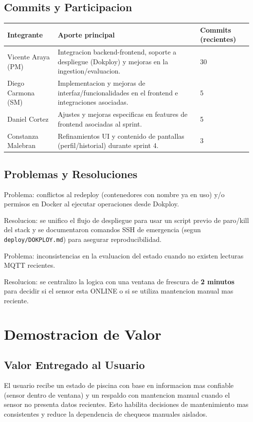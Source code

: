 \documentclass[11pt, a4paper]{article}
\begin{document}
\subsection{Commits y Participacion}
\begin{longtable}{@{} p{4cm} p{10.5cm} p{2cm} @{}}
  \toprule
  \textbf{Integrante} & \textbf{Aporte principal} & \textbf{Commits (recientes)} \\
  \midrule
  Vicente Araya (PM) & Integracion backend-frontend, soporte a despliegue (Dokploy) y mejoras en la ingestion/evaluacion. & 30 \\
  \midrule
  Diego Carmona (SM) & Implementacion y mejoras de interfaz/funcionalidades en el frontend e integraciones asociadas. & 5 \\
  \midrule
  Daniel Cortez & Ajustes y mejoras especificas en features de frontend asociadas al sprint. & 5 \\
  \midrule
  Constanza Malebran & Refinamientos UI y contenido de pantallas (perfil/historial) durante sprint 4. & 3 \\
  \bottomrule
\end{longtable}

\subsection{Problemas y Resoluciones}
Problema: conflictos al redeploy (contenedores con nombre ya en uso) y/o permisos en Docker al ejecutar operaciones desde Dokploy.

Resolucion: se unifico el flujo de despliegue para usar un script previo de paro/kill del stack y se documentaron comandos SSH de emergencia (segun \texttt{deploy/DOKPLOY.md}) para asegurar reproducibilidad.

Problema: inconsistencias en la evaluacion del estado cuando no existen lecturas MQTT recientes.

Resolucion: se centralizo la logica con una ventana de frescura de \textbf{2 minutos} para decidir si el sensor esta ONLINE o si se utiliza mantencion manual mas reciente.

\section{Demostracion de Valor}

\subsection{Valor Entregado al Usuario}
El usuario recibe un estado de piscina con base en informacion mas confiable (sensor dentro de ventana) y un respaldo con mantencion manual cuando el sensor no presenta datos recientes. Esto habilita decisiones de mantenimiento mas consistentes y reduce la dependencia de chequeos manuales aislados.
\end{document}
